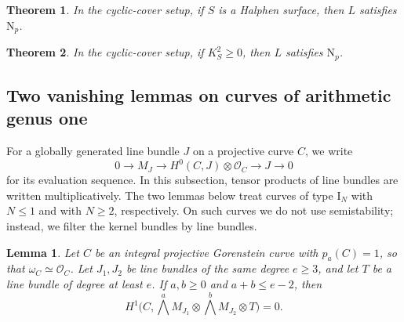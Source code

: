 \documentclass[11pt,reqno]{amsart}
\numberwithin{equation}{section}
\newtheorem{theorem}{Theorem}[section]
\newtheorem{lemma}[lemma]{Lemma}
\theoremstyle{remark}
\newcommand{\sshf}[1]{\mathcal{O}_{#1}}
\newcommand{\pa}{p_a}
\newcommand{\NP}{\mathrm N}
\begin{document}
\begin{theorem}\label{thm:halphen}
In the cyclic-cover setup, if \(S\) is a Halphen surface, then \(L\) satisfies \(\NP_p\).
\end{theorem}

\begin{theorem}\label{thm:nonnegative}
In the cyclic-cover setup, if \(K_S^2\geq0\), then \(L\) satisfies \(\NP_p\).
\end{theorem}

\subsection{Two vanishing lemmas on curves of arithmetic genus one}\label{sec:genus-one-curves}

For a globally generated line bundle \(J\) on a projective curve \(C\), we write
\[
 0\longrightarrow M_J\longrightarrow H^0(C,J)\otimes\sshf{C}\longrightarrow J\longrightarrow0
\]
for its evaluation sequence. In this subsection, tensor products of line bundles are written multiplicatively. The two lemmas below treat curves of type \(\mathrm I_N\) with \(N\leq1\) and with \(N\geq2\), respectively. On such curves we do not use semistability; instead, we filter the kernel bundles by line bundles.

\begin{lemma}\label{lem:halphen-integral}
Let \(C\) be an integral projective Gorenstein curve with \(\pa(C)=1\), so that \(\omega_C\simeq\sshf{C}\). Let \(J_1,J_2\) be line bundles of the same degree \(e\geq3\), and let \(T\) be a line bundle of degree at least \(e\). If \(a,b\geq0\) and \(a+b\leq e-2\), then
\[
 H^1\bigl(C,\textstyle\bigwedge^aM_{J_1}\otimes\bigwedge^bM_{J_2}\otimes T\bigr)=0.
\]
\end{lemma}
\end{document}
